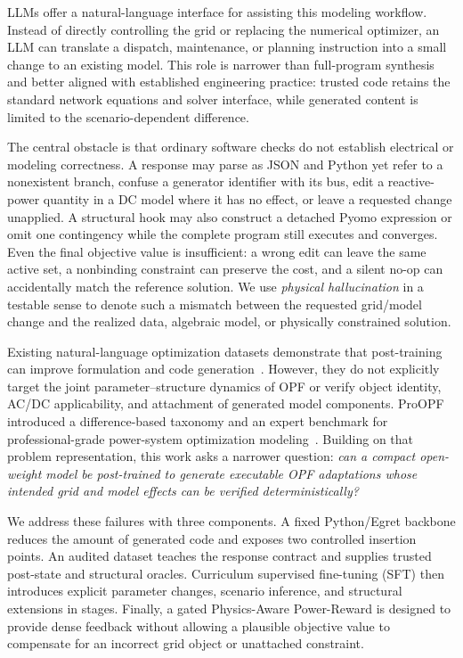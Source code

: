 \documentclass[lettersize,journal]{IEEEtran}
\newcommand{\methodname}{Power-Reward}
\begin{document}
LLMs offer a natural-language interface for assisting this modeling workflow. Instead of directly controlling the grid or replacing the numerical optimizer, an LLM can translate a dispatch, maintenance, or planning instruction into a small change to an existing model. This role is narrower than full-program synthesis and better aligned with established engineering practice: trusted code retains the standard network equations and solver interface, while generated content is limited to the scenario-dependent difference.

The central obstacle is that ordinary software checks do not establish electrical or modeling correctness. A response may parse as JSON and Python yet refer to a nonexistent branch, confuse a generator identifier with its bus, edit a reactive-power quantity in a DC model where it has no effect, or leave a requested change unapplied. A structural hook may also construct a detached Pyomo expression or omit one contingency while the complete program still executes and converges. Even the final objective value is insufficient: a wrong edit can leave the same active set, a nonbinding constraint can preserve the cost, and a silent no-op can accidentally match the reference solution. We use \emph{physical hallucination} in a testable sense to denote such a mismatch between the requested grid/model change and the realized data, algebraic model, or physically constrained solution.

Existing natural-language optimization datasets demonstrate that post-training can improve formulation and code generation~\cite{ramamonjison2023nl4opt,huang2024mamo,yang2025optibench,huang2025orlm}. However, they do not explicitly target the joint parameter--structure dynamics of OPF or verify object identity, AC/DC applicability, and attachment of generated model components. ProOPF introduced a difference-based taxonomy and an expert benchmark for professional-grade power-system optimization modeling~\cite{shen2026proopf}. Building on that problem representation, this work asks a narrower question: \emph{can a compact open-weight model be post-trained to generate executable OPF adaptations whose intended grid and model effects can be verified deterministically?}

We address these failures with three components. A fixed Python/Egret backbone reduces the amount of generated code and exposes two controlled insertion points. An audited dataset teaches the response contract and supplies trusted post-state and structural oracles. Curriculum supervised fine-tuning (SFT) then introduces explicit parameter changes, scenario inference, and structural extensions in stages. Finally, a gated Physics-Aware \methodname{} is designed to provide dense feedback without allowing a plausible objective value to compensate for an incorrect grid object or unattached constraint.
\end{document}

